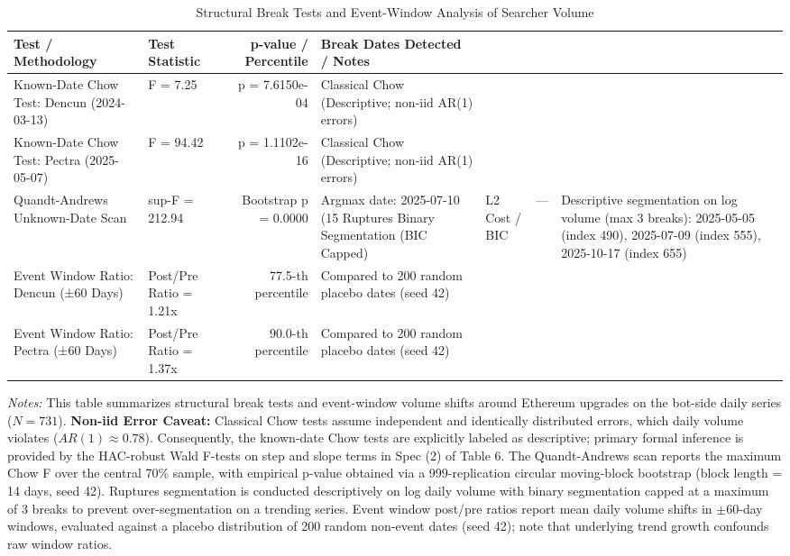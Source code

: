 \begin{table}[htbp]
\centering
\caption{Structural Break Tests and Event-Window Analysis of Searcher Volume}
\label{tab:structural_breaks}
\begin{tabular}{llrl}
\toprule
Test / Methodology & Test Statistic & p-value / Percentile & Break Dates Detected / Notes \\
\midrule
Known-Date Chow Test: Dencun (2024-03-13) & F = 7.25 & p = 7.6150e-04 & Classical Chow (Descriptive; non-iid AR(1) errors) \\
Known-Date Chow Test: Pectra (2025-05-07) & F = 94.42 & p = 1.1102e-16 & Classical Chow (Descriptive; non-iid AR(1) errors) \\
Quandt-Andrews Unknown-Date Scan & sup-F = 212.94 & Bootstrap p = 0.0000 & Argmax date: 2025-07-10 (15%
Ruptures Binary Segmentation (BIC Capped) & L2 Cost / BIC & --- & Descriptive segmentation on log volume (max 3 breaks): 2025-05-05 (index 490), 2025-07-09 (index 555), 2025-10-17 (index 655) \\
Event Window Ratio: Dencun (±60 Days) & Post/Pre Ratio = 1.21x & 77.5-th percentile & Compared to 200 random placebo dates (seed 42) \\
Event Window Ratio: Pectra (±60 Days) & Post/Pre Ratio = 1.37x & 90.0-th percentile & Compared to 200 random placebo dates (seed 42) \\
\bottomrule
\end{tabular}
\vspace{0.2cm}
\begin{minipage}{\linewidth}
\small
\textit{Notes:} This table summarizes structural break tests and event-window volume shifts around Ethereum upgrades on the bot-side daily series ($N=731$). \textbf{Non-iid Error Caveat:} Classical Chow tests assume independent and identically distributed errors, which daily volume violates ($AR(1) \approx 0.78$). Consequently, the known-date Chow tests are explicitly labeled as descriptive; primary formal inference is provided by the HAC-robust Wald F-tests on step and slope terms in Spec (2) of Table 6. The Quandt-Andrews scan reports the maximum Chow F over the central 70\% sample, with empirical p-value obtained via a 999-replication circular moving-block bootstrap (block length = 14 days, seed 42). Ruptures segmentation is conducted descriptively on log daily volume with binary segmentation capped at a maximum of 3 breaks to prevent over-segmentation on a trending series. Event window post/pre ratios report mean daily volume shifts in $\pm 60$-day windows, evaluated against a placebo distribution of 200 random non-event dates (seed 42); note that underlying trend growth confounds raw window ratios.
\end{minipage}
\end{table}
